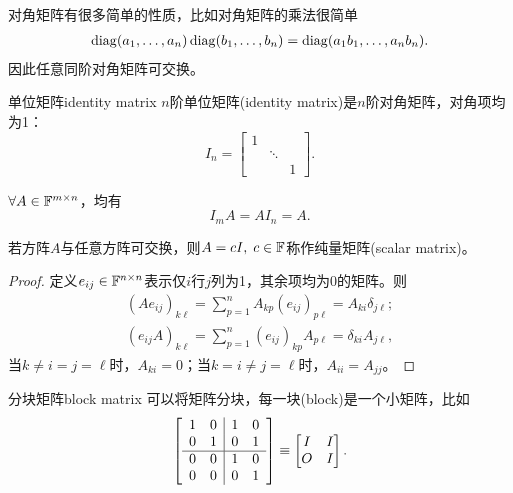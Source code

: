 \begin{remark}
	对角矩阵有很多简单的性质，比如对角矩阵的乘法很简单
	\begin{align}
		\operatorname{diag}(a_1,\ldots,a_n)\operatorname{diag}(b_1,\ldots,b_n)=\operatorname{diag}(a_1b_1,\ldots,a_nb_n).
	\end{align}
	因此任意同阶对角矩阵可交换。
\end{remark}

\begin{definition}{单位矩阵}{identity matrix}
	$n$阶单位矩阵(identity matrix)是$n$阶对角矩阵，对角项均为1：
	\[
		I_n=\begin{bmatrix}
		1&\\ &\ddots\\&&1
		\end{bmatrix}.
	\]
\end{definition}

\begin{corollary}
	$\forall A\in\mathbb F^{m\times n}$，均有
	\[
		I_mA=AI_n=A.
	\]
\end{corollary}

\begin{theorem}{}{}
	若方阵$A$与任意方阵可交换，则$A=cI,\;c\in\mathbb F$称作纯量矩阵(scalar matrix)。
\end{theorem}
\begin{proof}
	定义$e_{ij}\in\mathbb F^{n\times n}$表示仅$i$行$j$列为1，其余项均为0的矩阵。则
	\begin{align*}
		(Ae_{ij})_{k\ell}=\sum_{p=1}^nA_{kp}(e_{ij})_{p\ell}=A_{ki}\delta_{j\ell};\\
		(e_{ij}A)_{k\ell}=\sum_{p=1}^n(e_{ij})_{kp}A_{p\ell}=\delta_{ki}A_{j\ell},
	\end{align*}
	当$k\neq i=j=\ell$时，$A_{ki}=0$；当$k=i\neq j=\ell$时，$A_{ii}=A_{jj}$。
\end{proof}
\begin{definition}{分块矩阵}{block matrix}
	可以将矩阵分块，每一块(block)是一个小矩阵，比如
	\begin{align*}
		\left[\begin{array}{cc|cc}
			1&0&1&0\\
			0&1&0&1\\
			\hline
			0&0&1&0\\
			0&0&0&1	
		\end{array}\right]\equiv\begin{bmatrix}
			I&I\\O&I
		\end{bmatrix}.
	\end{align*}
\end{definition}

